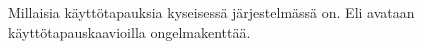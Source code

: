 Millaisia käyttötapauksia kyseisessä järjestelmässä on. Eli avataan käyttötapauskaavioilla ongelmakenttää.
